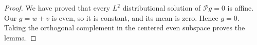 \begin{proof}
We have proved that every $L^2$ distributional solution of $\mathcal{P} g=0$ is affine.  Our $g=w+v$ is even, so it is constant, and its mean is zero. Hence $g=0$.  Taking the orthogonal complement in the centered even subspace proves the lemma.
\end{proof}
